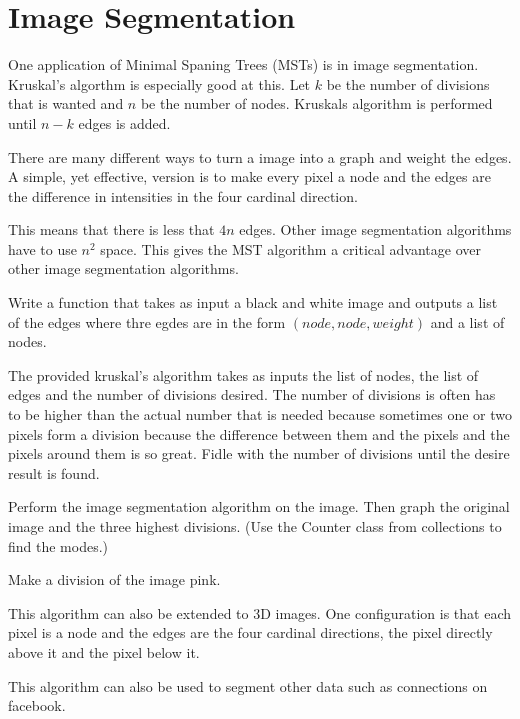 \label{Ch:MSTImgSeg}


\section*{Image Segmentation}


One application of Minimal Spaning Trees (MSTs) is in image segmentation. Kruskal's algorthm is especially good at this. Let $k$ be the number of divisions that is wanted and $n$ be the number of nodes. Kruskals algorithm is performed until $n-k$ edges is added.

There are many different ways to turn a image into a graph and weight the edges. A simple, yet effective, version is to make every pixel a node and the edges are the difference in intensities in the four cardinal direction. 

This means that there is less that $4n$ edges. Other image segmentation algorithms have to use $n^2$ space. This gives the MST algorithm a critical advantage over other image segmentation algorithms. 

\begin{problem}
Write a function that takes as input a black and white image and outputs a list of the edges where thre egdes are in the form $(node,node,weight)$ and a list of nodes.
\end{problem}

The provided kruskal's algorithm takes as inputs the list of nodes, the list of edges and the number of divisions desired. The number of divisions is often has to be higher than the actual number that is needed because sometimes one or two pixels form a division because the difference between them and the pixels and the pixels around them is so great. Fidle with the number of divisions until the desire result is found.

\begin{problem}
Perform the image segmentation algorithm on the image. Then graph the original image and the three highest divisions. (Use the Counter class from collections to find the modes.) 
\end{problem}

\begin{problem}
Make a division of the image pink.
\end{problem}

This algorithm can also be extended to 3D images. One configuration is that each pixel is a node and the edges are the four cardinal directions, the pixel directly above it and the pixel below it.

This algorithm can also be used to segment other data such as connections on facebook. 
